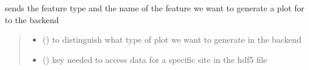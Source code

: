 \documentclass[letterpaper,10pt,english]{sphinxmanual}
\begin{document}

\begin{fulllineitems}
\label{\detokenize{docs_gui/js_api/urbs_results/setup_urbs_results:getPlotOfFeature}}
\pysigstartsignatures
{}
\pysigstopsignatures
\sphinxAtStartPar
sends the feature type and the name of the feature we want to generate a plot for to the backend
\begin{quote}\begin{description}
\begin{itemize}
\item {} 
\sphinxAtStartPar
{} () \textendash{} to distinguish what type of plot we want to generate in the backend

\item {} 
\sphinxAtStartPar
{} () \textendash{} key needed to access data for a specific site in the hdf5 file

\end{itemize}

\end{description}\end{quote}

\end{fulllineitems}

\end{document}
